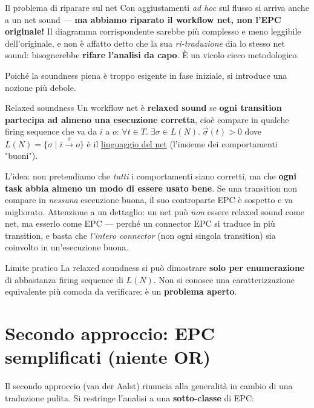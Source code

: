 \begin{boxwarning}{Il problema di riparare sul net}
Con aggiustamenti \emph{ad hoc} sul flusso si arriva anche a un net sound — \textbf{ma abbiamo riparato il workflow net, non l'EPC originale!} Il diagramma corrispondente sarebbe più complesso e meno leggibile dell'originale, e non è affatto detto che la sua \emph{ri-traduzione} dia lo stesso net sound: bisognerebbe \textbf{rifare l'analisi da capo}. È un vicolo cieco metodologico.
\end{boxwarning}

Poiché la soundness piena è troppo esigente in fase iniziale, si introduce una nozione più debole.

\begin{boxdefinition}{Relaxed soundness}
Un workflow net è \textbf{relaxed sound} se \textbf{ogni transition partecipa ad almeno una esecuzione corretta}, cioè compare in qualche firing sequence che va da $i$ a $o$: \(\forall t \in T.\; \exists \sigma \in L(N).\; \vec{\sigma}(t) > 0\) dove $L(N) = \{\sigma \mid i \xrightarrow{\sigma} o\}$ è il \hyperref[ch:12]{linguaggio del net} (l'insieme dei comportamenti "buoni").
\end{boxdefinition}

L'idea: non pretendiamo che \emph{tutti} i comportamenti siano corretti, ma che \textbf{ogni task abbia almeno un modo di essere usato bene}. Se una transition non compare in \emph{nessuna} esecuzione buona, il suo controparte EPC è sospetto e va migliorato. Attenzione a un dettaglio: un net può \emph{non} essere relaxed sound come net, ma esserlo come EPC — perché un connector EPC si traduce in più transition, e basta che \emph{l'intero connector} (non ogni singola transition) sia coinvolto in un'esecuzione buona.

\begin{boxnote}{Limite pratico}
La relaxed soundness si può dimostrare \textbf{solo per enumerazione} di abbastanza firing sequence di $L(N)$. Non si conosce una caratterizzazione equivalente più comoda da verificare: è un \textbf{problema aperto}.
\end{boxnote}

\section{\texorpdfstring{Secondo approccio: EPC semplificati (niente OR)}{Secondo approccio: EPC semplificati (niente OR)}}

Il secondo approccio (van der Aalst) rinuncia alla generalità in cambio di una traduzione pulita. Si restringe l'analisi a una \textbf{sotto-classe} di EPC:

